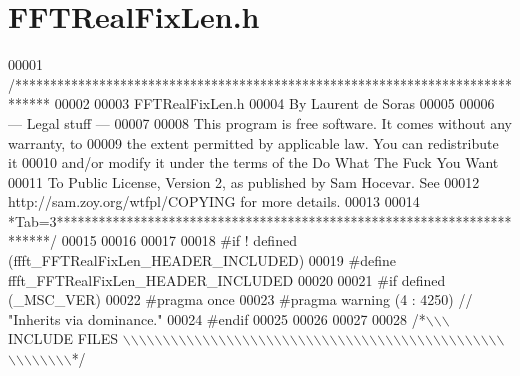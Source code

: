 \hypertarget{a00097_source}{\section{F\+F\+T\+Real\+Fix\+Len.\+h}
\label{a00097_source}
}

\begin{DoxyCode}
00001 \textcolor{comment}{/*****************************************************************************}
00002 \textcolor{comment}{}
00003 \textcolor{comment}{        FFTRealFixLen.h}
00004 \textcolor{comment}{        By Laurent de Soras}
00005 \textcolor{comment}{}
00006 \textcolor{comment}{--- Legal stuff ---}
00007 \textcolor{comment}{}
00008 \textcolor{comment}{This program is free software. It comes without any warranty, to}
00009 \textcolor{comment}{the extent permitted by applicable law. You can redistribute it}
00010 \textcolor{comment}{and/or modify it under the terms of the Do What The Fuck You Want}
00011 \textcolor{comment}{To Public License, Version 2, as published by Sam Hocevar. See}
00012 \textcolor{comment}{http://sam.zoy.org/wtfpl/COPYING for more details.}
00013 \textcolor{comment}{}
00014 \textcolor{comment}{*Tab=3***********************************************************************/}
00015 
00016 
00017 
00018 \textcolor{preprocessor}{#if ! defined (ffft\_FFTRealFixLen\_HEADER\_INCLUDED)}
00019 \textcolor{preprocessor}{#define ffft\_FFTRealFixLen\_HEADER\_INCLUDED}
00020 
00021 \textcolor{preprocessor}{#if defined (\_MSC\_VER)}
00022 \textcolor{preprocessor}{    #pragma once}
00023 \textcolor{preprocessor}{    #pragma warning (4 : 4250) // "Inherits via dominance."}
00024 \textcolor{preprocessor}{#endif}
00025 
00026 
00027 
00028 \textcolor{comment}{/*\(\backslash\)\(\backslash\)\(\backslash\) INCLUDE FILES \(\backslash\)\(\backslash\)\(\backslash\)\(\backslash\)\(\backslash\)\(\backslash\)\(\backslash\)\(\backslash\)\(\backslash\)\(\backslash\)\(\backslash\)\(\backslash\)\(\backslash\)\(\backslash\)\(\backslash\)\(\backslash\)\(\backslash\)\(\backslash\)\(\backslash\)\(\backslash\)\(\backslash\)\(\backslash\)\(\backslash\)\(\backslash\)\(\backslash\)\(\backslash\)\(\backslash\)\(\backslash\)\(\backslash\)\(\backslash\)\(\backslash\)\(\backslash\)\(\backslash\)\(\backslash\)\(\backslash\)\(\backslash\)\(\backslash\)\(\backslash\)\(\backslash\)\(\backslash\)\(\backslash\)\(\backslash\)\(\backslash\)\(\backslash\)\(\backslash\)\(\backslash\)\(\backslash\)\(\backslash\)\(\backslash\)\(\backslash\)\(\backslash\)\(\backslash\)\(\backslash\)\(\backslash\)\(\backslash\)\(\backslash\)*/}

\end{DoxyCode}
